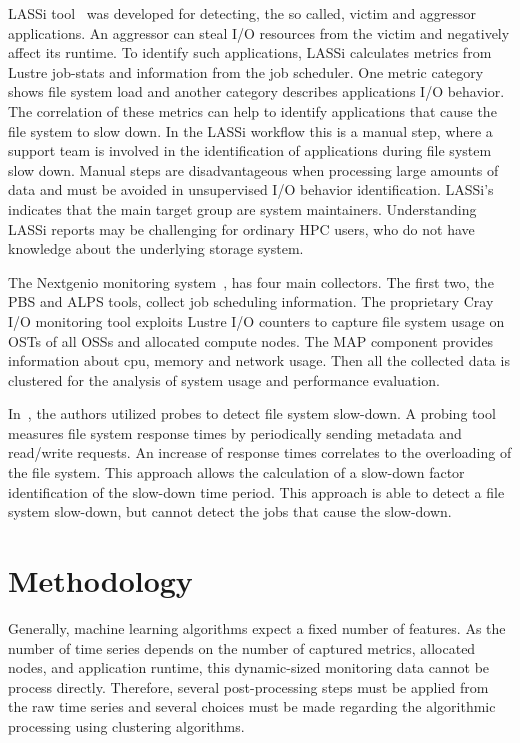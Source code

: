 \documentclass[]{llncs}
\begin{document}
LASSi tool~\cite{DBLP:journals/corr/abs-1906-03884} was developed for detecting, the so called, victim and aggressor applications.
An aggressor can steal I/O resources from the victim and negatively affect its runtime.
To identify such applications, LASSi calculates metrics from Lustre job-stats and information from the job scheduler.
One metric category shows file system load and another category describes applications I/O behavior.
The correlation of these metrics can help to identify applications that cause the file system to slow down.
In the LASSi workflow this is a manual step, where a support team is involved in the identification of applications during file system slow down.
Manual steps are disadvantageous when processing large amounts of data and must be avoided in unsupervised I/O behavior identification.
LASSi's indicates that the main target group are system maintainers.
Understanding LASSi reports may be challenging for ordinary HPC users, who do not have knowledge about the underlying storage system.

The Nextgenio monitoring system~\cite{nextgenio2016}, has four main collectors.
The first two, the PBS and ALPS tools, collect job scheduling information.
The proprietary Cray I/O monitoring tool exploits Lustre I/O counters to capture file system usage on OSTs of all OSSs and allocated compute nodes.
The MAP component provides information about cpu, memory and network usage.
Then all the collected data is clustered for the analysis of system usage and performance evaluation.

In~\cite{TUISVPKB19}, the authors utilized probes to detect file system slow-down.
A probing tool measures file system response times by periodically sending metadata and read/write requests.
An increase of response times correlates to the overloading of the file system.
This approach allows the calculation of a slow-down factor identification of the slow-down time period.
This approach is able to detect a file system slow-down, but cannot detect the jobs that cause the slow-down.

\section{Methodology}
Generally, machine learning algorithms expect a fixed number of features.
As the number of time series  depends on the number of captured metrics, allocated nodes, and application runtime, this dynamic-sized monitoring data cannot be process directly.
Therefore, several post-processing steps must be applied from the raw time series and several choices must be made regarding the algorithmic processing using clustering algorithms.
\end{document}
